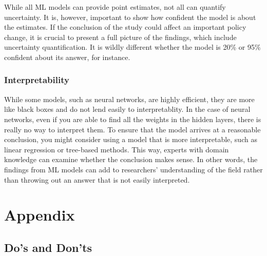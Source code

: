 \documentclass[
]{book}
\begin{document}
While all ML models can provide point estimates, not all can quantify uncertainty. It is, however, important to show how confident the model is about the estimates. If the conclusion of the study could affect an important policy change, it is crucial to present a full picture of the findings, which include uncertainty quantification. It is wildly different whether the model is 20\% or 95\% confident about its answer, for instance.

\hypertarget{interpretability}{%
\subsection{Interpretability}\label{interpretability}}

While some models, such as neural networks, are highly efficient, they are more like black boxes and do not lend easily to interpretablity. In the case of neural networks, even if you are able to find all the weights in the hidden layers, there is really no way to interpret them. To ensure that the model arrives at a reasonable conclusion, you might consider using a model that is more interpretable, such as linear regression or tree-based methods. This way, experts with domain knowledge can examine whether the conclusion makes sense. In other words, the findings from ML models can add to researchers' understanding of the field rather than throwing out an answer that is not easily interpreted.

\hypertarget{appendix}{%
\chapter{Appendix}\label{appendix}}

\hypertarget{dos-and-donts}{%
\section{Do's and Don'ts}\label{dos-and-donts}}

  
\end{document}
